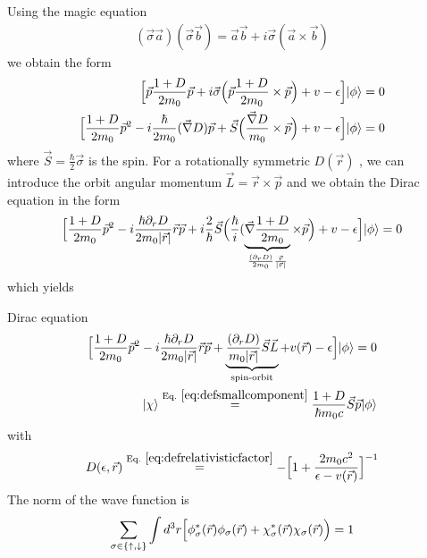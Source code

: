 \documentclass[11pt,a4paper]{report}
\begin{document}
Using the magic equation
\begin{eqnarray}
(\vec{\sigma}\vec{a})(\vec{\sigma}\vec{b})
=\vec{a}\vec{b}+i\vec{\sigma}(\vec{a}\times\vec{b})
\end{eqnarray}
we obtain the form
\begin{eqnarray}
\Bigl[\vec{p} \frac{1+D}{2m_0}\vec{p} 
+i\vec{\sigma} 
\Bigl(\vec{p} \frac{1+D}{2m_0}\times\vec{p} \Bigr)
+v-\epsilon\Bigr]|\phi\rangle=0
\nonumber\\
\Bigl[\frac{1+D}{2m_0}\vec{p}^2-i\frac{\hbar}{2m_0}(\vec{\nabla}D)\vec{p}
+\vec{S}\Bigl(\frac{\vec{\nabla}D}{m_0}\times\vec{p} \Bigr)
+v-\epsilon\Bigr]|\phi\rangle=0
\end{eqnarray}
where $\vec{S}=\frac{\hbar}{2}\vec{\sigma}$ is the spin.  For a
rotationally symmetric $D(\vec{r})$ , we can
introduce the orbit angular momentum $\vec{L}=\vec{r}\times\vec{p}$
and we obtain the Dirac equation in the form
\begin{eqnarray}
\Bigl[
\frac{1+D}{2m_0}\vec{p}^2 
-i\frac{\hbar\partial_rD}{2m_0|\vec{r}|}\vec{r}\vec{p} 
+i\frac{2}{\hbar}\vec{S} 
\Bigl(\frac{\hbar}{i}(\underbrace{\vec{\nabla}\frac{1+D}{2m_0}}
_{\frac{(\partial_r D)}{2m_0}\frac{\vec{r}}{|\vec{r}|}}\times\vec{p} \Bigr)
+v-\epsilon\Bigr]|\phi\rangle=0
\end{eqnarray}
which yields
\begin{myshadowminipage}{Dirac equation}
\begin{eqnarray}
\Bigl[
\frac{1+D}{2m_0}\vec{p}^2 
-i\frac{\hbar\partial_rD}{2m_0|\vec{r}|}\vec{r}\vec{p} 
+ \underbrace{\frac{(\partial_r D)}{m_0|\vec{r}|}\vec{S}\vec{L}}_{\text{spin-orbit}}
+v(\vec{r})-\epsilon\Bigr]|\phi\rangle=0
\nonumber\\
|\chi\rangle
\eqrel{eq:defsmallcomponent}{=}
\frac{1+D}{\hbar m_0c}
\vec{S}\vec{p} |\phi\rangle
\end{eqnarray}
with
\begin{eqnarray}
D(\epsilon,\vec{r})
\eqrel{eq:defrelativisticfactor}{=}
-\Bigl[1+\frac{2m_0c^2}{\epsilon-v(\vec{r})}\Bigr]^{-1}
\end{eqnarray}
The norm of the wave function is
\begin{eqnarray}
\sum_{\sigma\in\{\uparrow,\downarrow\}} \int d^3r 
\Bigl[\phi_\sigma^*(\vec{r})\phi_\sigma(\vec{r})
+\chi_\sigma^*(\vec{r})\chi_\sigma(\vec{r})\Bigr)=1
\end{eqnarray}
\end{myshadowminipage}

\end{document}
